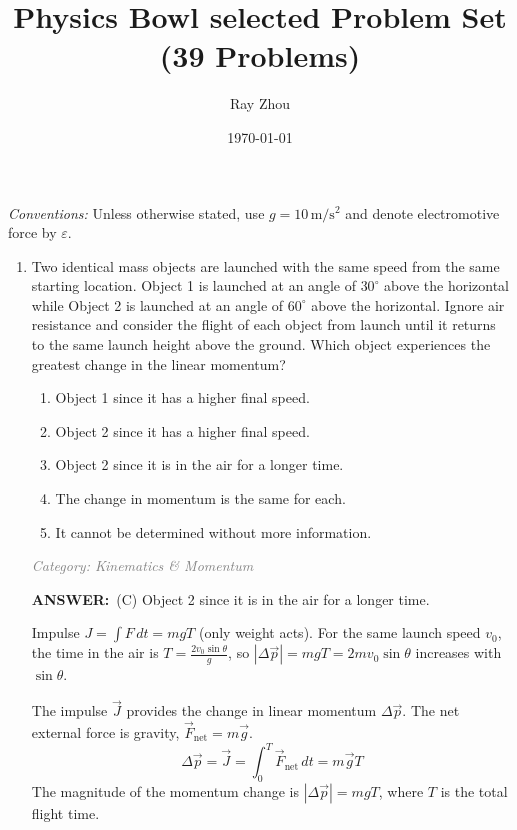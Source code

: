 \documentclass[12pt, a4paper]{article}
\title{Physics Bowl selected Problem Set (39 Problems)}
\author{Ray Zhou}
\date{\today}
\makeatletter
\newcommand{\finalanswer}[1]{\textbf{ANSWER:}~#1}
\newif\if@categoryprinted
\newcommand{\category}[1]{\if@categoryprinted\relax\else\textit{\textcolor{gray}{Category: #1}}\global\@categoryprintedtrue\fi}
\makeatother
\begin{document}
\begin{CJK*}{UTF8}{gbsn}

\maketitle

\noindent\textit{Conventions:} Unless otherwise stated, use \(g=10\,\mathrm{m/s^2}\) and denote electromotive force by \(\varepsilon\).\par\smallskip
\newpage

\begin{enumerate}[itemsep=1.0em, topsep=0.6em]

\item \label{prob:1}
Two identical mass objects are launched with the same speed from the same starting location. Object 1 is launched at an angle of $30^\circ$ above the horizontal while Object 2 is launched at an angle of $60^\circ$ above the horizontal. Ignore air resistance and consider the flight of each object from launch until it returns to the same launch height above the ground. Which object experiences the greatest change in the linear momentum?
\begin{enumerate}[label=(\Alph*)]
    \item Object 1 since it has a higher final speed.
    \item Object 2 since it has a higher final speed.
    \item Object 2 since it is in the air for a longer time.
    \item The change in momentum is the same for each.
    \item It cannot be determined without more information.
\end{enumerate}

\category{Kinematics \& Momentum}
\begin{answerbox}
\finalanswer{(C) Object 2 since it is in the air for a longer time.}
\end{answerbox}
\begin{insightbox}
Impulse $J=\int F\,dt=mgT$ (only weight acts). For the same launch speed $v_0$, the time in the air is $T=\tfrac{2v_0\sin\theta}{g}$, so $|\Delta\vec p|=mgT=2mv_0\sin\theta$ increases with $\sin\theta$.
\end{insightbox}
\begin{solutionbox}
The impulse $\vec{J}$ provides the change in linear momentum $\Delta \vec{p}$. The net external force is gravity, $\vec{F}_{\text{net}} = m\vec{g}$.
\[
\Delta \vec{p} = \vec{J} = \int_{0}^{T} \vec{F}_{\text{net}} \, dt = m\vec{g}T
\]
The magnitude of the momentum change is $|\Delta \vec{p}| = mgT$, where $T$ is the total flight time.


\end{solutionbox}
\end{enumerate}
\end{CJK*}
\end{document}
